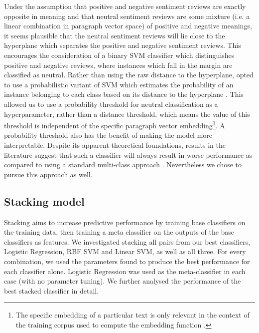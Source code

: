 \documentclass[11pt]{article}
\newcommand{\drafting}[1]{\textcolor{OliveGreen}{#1}}
\begin{document}
Under the assumption that positive and negative sentiment reviews are exactly opposite in meaning and that neutral sentiment reviews are some mixture (i.e. a linear combination in paragraph vector space) of positive and negative meanings, it seems plausible that the neutral sentiment reviews will lie close to the hyperplane which separates the positive and negative sentiment reviews. This encourages the consideration of a binary SVM classifier which distinguishes positive and negative reviews, where instances which fall in the margin are classified as neutral. Rather than using the raw distance to the hyperplane, opted to use a probabilistic variant of SVM which estimates the probability of an instance belonging to each class based on its distance to the hyperplane \cite{platt_probabilistic_1999}. This allowed us to use a probability threshold for neutral classification as a hyperparameter, rather than a distance threshold, which means the value of this threshold is independent of the specific paragraph vector embedding\footnote{The specific embedding of a particular text is only relevant in the context of the training corpus used to compute the embedding function \cite{le_distributed_2014}.}. A probability threshold also has the benefit of making the model more interpretable. Despite its apparent theoretical foundations, results in the literature suggest that such a classifier will always result in worse performance as compared to using a standard multi-class approach \cite{koppel_importance_2006}. Nevertheless we chose to pursue this approach as well.


\subsection{Stacking model}
\drafting{
Stacking aims to increase predictive performance by training base classifiers on the training data, then training a meta classifier on the outputs of the base classifiers as features. We investigated stacking all pairs from our best classifiers, Logistic Regression, RBF SVM and Linear SVM, as well as all three. For every combination, we used the parameters found to produce the best performance for each classifier alone. Logistic Regression was used as the meta-classifier in each case (with no parameter tuning).
We further analysed the performance of the best stacked classifier in detail.
}
\end{document}

